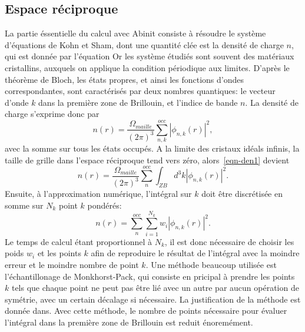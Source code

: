 \subsection{Espace réciproque}
\label{subsec-reciprocal}
La partie éssentielle du calcul avec Abinit consiste à résoudre le système d'équations de Kohn et Sham,
dont une quantité clée est la densité de charge $n$, qui est donnée par l'équation %
Or les système étudiés sont souvent des matériaux cristallins,
auxquels on applique la condition périodique aux limites.
D'après le théorème de Bloch, les états propres, et ainsi les fonctions d'ondes correspondantes,
sont caractérisés par deux nombres quantiques:
le vecteur d'onde $k$ dans la première zone de Brillouin, et l'indice de bande $n$.
La densité de charge s'exprime donc par
\begin{equation}
  \label{eqn-den1}
  n(r) = \frac{\Omega_{maille}}{{(2\pi)}^3} \sum_{n, k}^{occ}|\phi_{n, k}(r)|^2,
\end{equation}
avec la somme sur tous les états occupés.
A la limite des cristaux idéals infinis, la taille de grille dans l'espace réciproque tend vers zéro,
alors~\cref{eqn-den1} devient
\begin{equation}
  \label{eqn-den2}
  n(r) = \frac{\Omega_{maille}}{{(2\pi)}^3} \sum_n^{occ}\int_{ZB}d^3k|\phi_{n, k}(r)|^2.
\end{equation}
Ensuite, à l'approximation numérique,
l'intégral sur $k$ doit être discrétisée en somme sur $N_k$ point $k$ pondérés:
\begin{equation}
  \label{eqn-den3}
  n(r) = \sum_n^{occ}\sum_{i=1}^{N_k}w_i|\phi_{n, k}(r)|^2.
\end{equation}
Le temps de calcul étant proportionnel à $N_k$,
il est donc nécessaire de choisir les poids $w_i$ et les points $k$ afin de reproduire le résultat
de l'intégral avec la moindre erreur et le moindre nombre de point $k$.
Une méthode beaucoup utilisée est l'échantillonage de Monkhorst-Pack,
qui consiste en pricipal à prendre les points $k$ tels que chaque point ne peut pas être lié avec un autre par aucun opération de symétrie,%
avec un certain décalage si nécessaire.
La justification de la méthode est donnée dans.%
Avec cette méthode, le nombre de points nécessaire pour évaluer l'intégral dans la première zone de Brillouin est reduit énoremément.

